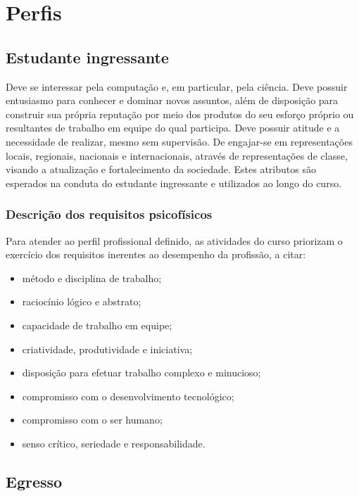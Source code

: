 \documentclass[
	12pt,				%
	openright,			%
  oneside,     %
	a4paper,			%
	english,			%
	french,				%
	spanish,			%
	brazil				%
	]{abntex2}
\begin{document}
\chapter{Perfis}

\section{Estudante ingressante}

Deve se interessar pela computação e, em particular, pela ciência. Deve possuir
entusiasmo para conhecer e dominar novos assuntos, além de disposição  para
construir sua própria reputação por meio dos produtos do seu esforço  próprio ou
resultantes de trabalho em equipe do qual participa.  Deve possuir atitude e a
necessidade de realizar, mesmo sem supervisão. De engajar-se em representações
locais, regionais, nacionais e internacionais, através de representações de
classe, visando a atualização e fortalecimento da sociedade. Estes atributos são
esperados na conduta do estudante ingressante e utilizados ao longo do curso.

\subsection{Descrição dos requisitos psicofísicos}
 
Para atender ao perfil profissional definido, as atividades do curso priorizam o
exercício dos requisitos inerentes ao desempenho da profissão, a citar:

\begin{itemize}
  \item método e disciplina de trabalho;
  \item raciocínio lógico e abstrato; 
  \item capacidade de trabalho em equipe; 
  \item criatividade, produtividade e iniciativa; 
  \item disposição para efetuar trabalho complexo e minucioso; 
  \item compromisso com o desenvolvimento tecnológico; 
  \item compromisso com o ser humano; 
  \item senso crítico, seriedade e responsabilidade. 
\end{itemize}


\section{Egresso}
\end{document}
